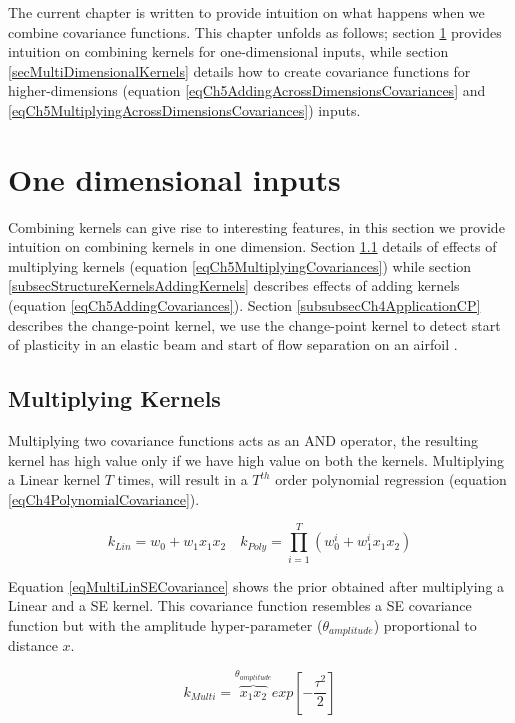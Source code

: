 The current chapter is written to provide intuition on what happens when we combine covariance functions. This chapter unfolds as follows; section \ref{secSingleDimension} provides intuition on combining kernels for one-dimensional inputs, while section \ref{secMultiDimensionalKernels} details how to create covariance functions for higher-dimensions (equation \ref{eqCh5AddingAcrossDimensionsCovariances} and \ref{eqCh5MultiplyingAcrossDimensionsCovariances}) inputs. 

\section{One dimensional inputs}\label{secSingleDimension}
Combining kernels can give rise to interesting features, in this section we provide intuition on combining kernels in one dimension. Section \ref{subsecStructureKernelsMultiplyingKernels} details of effects of multiplying kernels (equation \ref{eqCh5MultiplyingCovariances}) while section \ref{subsecStructureKernelsAddingKernels} describes effects of adding kernels (equation \ref{eqCh5AddingCovariances}). Section \ref{subsubsecCh4ApplicationCP} describes the change-point kernel, we use the change-point kernel to detect start of plasticity in an elastic beam and start of flow separation on an airfoil \cite{chiplunkar:hal-01555401}. 


\subsection{Multiplying Kernels} \label{subsecStructureKernelsMultiplyingKernels}
Multiplying two covariance functions acts as an AND operator, the resulting kernel has high value only if we have high value on both the kernels. Multiplying a Linear kernel $T$ times, will result in a $T^{th}$ order polynomial regression (equation \ref{eqCh4PolynomialCovariance}). 

\begin{equation}\label{eqCh4PolynomialCovariance}
k_{Lin} = w_{0} + w_{1}x_{1}x_{2} \quad k_{Poly} = \prod_{i=1}^{T} \left (w_{0}^{i} + w_{1}^{i}x_{1}x_{2} \right)
\end{equation}

Equation \ref{eqMultiLinSECovariance} shows the prior obtained after multiplying a Linear and a SE kernel. This covariance function resembles a SE covariance function but with the amplitude hyper-parameter ($\theta_{amplitude}$) proportional to distance \(x\). 

\begin{equation}\label{eqMultiLinSECovariance}
k_{Multi} = \overbrace{x_{1}x_{2}}^{\theta_{amplitude}} exp[- \frac{\tau^2}{2}]
\end{equation}

